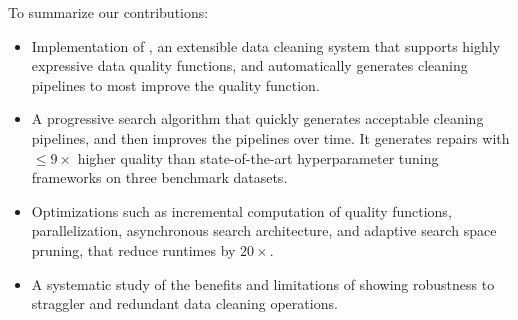 \smallskip\noindent To summarize our contributions:

\begin{itemize}[leftmargin=*, topsep=0mm, itemsep=0mm]
  \item Implementation of \sys, an extensible data cleaning system that supports highly expressive data quality functions, and automatically generates cleaning pipelines to most improve the quality function.  
  \item A progressive search algorithm that quickly generates acceptable cleaning pipelines, and then improves the pipelines over time.  It generates repairs with $\le 9\times$ higher quality than state-of-the-art hyperparameter tuning frameworks on three benchmark datasets.
  \item Optimizations such as incremental computation of quality functions, parallelization, asynchronous search architecture, and adaptive search space pruning, that reduce runtimes by $20\times$.   
  \item A systematic study of the benefits and limitations of \sys showing robustness to straggler and redundant data cleaning operations.
\end{itemize}



